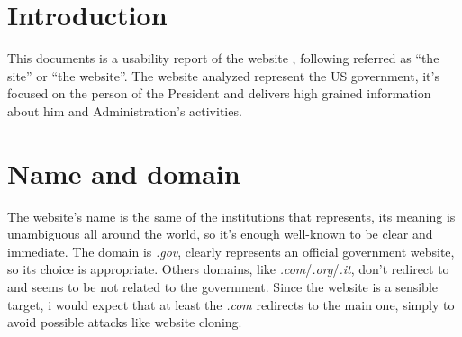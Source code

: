\documentclass[
10pt, %
a4paper, %
oneside, %
headinclude,footinclude, %
BCOR5mm, %
]{scrartcl}
\begin{document}




\newpage %


\section{Introduction}
	This documents is a usability report of the website \thesite{}, following referred as ``the site'' or ``the website''. The website analyzed represent the US government, it's focused on the person of the President and delivers high grained information about him and Administration's activities.  
 

\section{Name and domain}

The website's name is the same of the institutions that represents, its meaning is unambiguous all around the world, so it's enough well-known to be clear and immediate. The domain is \emph{.gov}, clearly represents an official government website, so its choice is appropriate. Others domains, like \emph{.com}/\emph{.org}/\emph{.it}, don't redirect to \thesite{} and seems to be not related to the government. Since the website is a sensible target, i would expect that at least the \emph{.com} redirects to the main one, simply to avoid possible attacks like website cloning.
\end{document}
